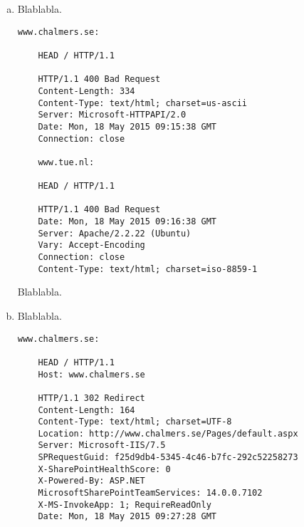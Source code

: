 \documentclass[a4paper,9pt,fleqn]{article}
\begin{document}
\begin{enumerate}[{Task} 1]
\begin{enumerate}[a)]
\begin{lstlisting}
	www.tue.nl:

	HEAD / HTTP/1.0

	HTTP/1.1 301 Moved Permanently
	Date: Mon, 18 May 2015 08:24:17 GMT
	Server: Apache/2.2.22 (Ubuntu)
	X-Powered-By: PHP/5.3.10-1ubuntu3.18
	Location: http://www.tue.nl/
	Vary: Accept-Encoding
	Content-Type: text/html


	Connection closed by foreign host.
\end{lstlisting}

		{\outp www.tue.nl} is using the web server type {\outp Apache/2.2.22 (Ubuntu)}.
		301 Move Permanently means that the resource we are requesting has been redirected
		to a new URL. The new URL is specified in the Location field. In this case www.tue.nl
		is redirecting to http://www.tue.nl/. The Vary field specifies which fields of the
		request header to take into account when trying to find the right object in the cache.
		\\
		\item 
		Blablabla.

\begin{lstlisting}
www.chalmers.se:

	HEAD / HTTP/1.1

	HTTP/1.1 400 Bad Request
	Content-Length: 334
	Content-Type: text/html; charset=us-ascii
	Server: Microsoft-HTTPAPI/2.0
	Date: Mon, 18 May 2015 09:15:38 GMT
	Connection: close

	www.tue.nl:

	HEAD / HTTP/1.1

	HTTP/1.1 400 Bad Request
	Date: Mon, 18 May 2015 09:16:38 GMT
	Server: Apache/2.2.22 (Ubuntu)
	Vary: Accept-Encoding
	Connection: close
	Content-Type: text/html; charset=iso-8859-1
\end{lstlisting}
		
		Blablabla.
		\\
		\item 
		Blablabla.

\begin{lstlisting}
www.chalmers.se:

	HEAD / HTTP/1.1
	Host: www.chalmers.se

	HTTP/1.1 302 Redirect
	Content-Length: 164
	Content-Type: text/html; charset=UTF-8
	Location: http://www.chalmers.se/Pages/default.aspx
	Server: Microsoft-IIS/7.5
	SPRequestGuid: f25d9db4-5345-4c46-b7fc-292c52258273
	X-SharePointHealthScore: 0
	X-Powered-By: ASP.NET
	MicrosoftSharePointTeamServices: 14.0.0.7102
	X-MS-InvokeApp: 1; RequireReadOnly
	Date: Mon, 18 May 2015 09:27:28 GMT


\end{lstlisting}
\end{enumerate}
\end{enumerate}
\end{document}
